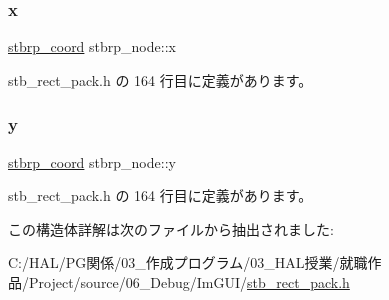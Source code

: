 \mbox{\label{structstbrp__node_a45ab31a88025db27d08040d715b129ea}} 
\subsubsection{\texorpdfstring{x}{x}}
{\footnotesize\ttfamily \mbox{\hyperlink{stb__rect__pack_8h_ac2c2491b95dea6a298b7423dc762dfd9}{stbrp\+\_\+coord}} stbrp\+\_\+node\+::x}



 stb\+\_\+rect\+\_\+pack.\+h の 164 行目に定義があります。

\mbox{\label{structstbrp__node_ad0415cb102a4f37aa45073653307e67e}} 
\subsubsection{\texorpdfstring{y}{y}}
{\footnotesize\ttfamily \mbox{\hyperlink{stb__rect__pack_8h_ac2c2491b95dea6a298b7423dc762dfd9}{stbrp\+\_\+coord}} stbrp\+\_\+node\+::y}



 stb\+\_\+rect\+\_\+pack.\+h の 164 行目に定義があります。



この構造体詳解は次のファイルから抽出されました\+:\begin{DoxyCompactItemize}
\item 
C\+:/\+H\+A\+L/\+P\+G関係/03\+\_\+作成プログラム/03\+\_\+\+H\+A\+L授業/就職作品/\+Project/source/06\+\_\+\+Debug/\+Im\+G\+U\+I/\mbox{\hyperlink{stb__rect__pack_8h}{stb\+\_\+rect\+\_\+pack.\+h}}\end{DoxyCompactItemize}
